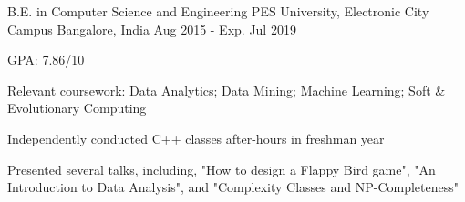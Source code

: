

\begin{cventries}

  \cventry
    {B.E. in Computer Science and Engineering} %
    {PES University, Electronic City Campus} %
    {Bangalore, India} %
    {Aug 2015 - Exp. Jul 2019} %
    {
      \begin{cvitems} %
        \item {GPA: 7.86/10}
        \item {Relevant coursework: Data Analytics; Data Mining; Machine Learning; Soft \& Evolutionary Computing}
        \item {Independently conducted C++ classes after-hours in freshman year}
        \item {Presented several talks, including, "How to design a Flappy Bird game", "An Introduction to Data Analysis", and "Complexity Classes and NP-Completeness"}
      \end{cvitems}
    }

\end{cventries}
